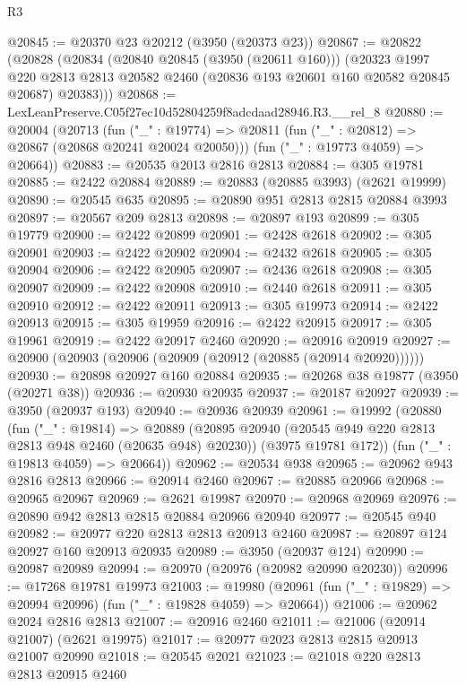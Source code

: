 \begin{lexlean}{R3}
\begin{coremodule}
@20845 := @20370 @23 @20212 (@3950 (@20373 @23))
@20867 := @20822
    (@20828
      (@20834
        (@20840 @20845 (@3950 (@20611 @160)))
        (@20323
          @1997
          @220
          @2813
          @2813
          @20582
          @2460
          (@20836 @193 @20601 @160 @20582 @20845 @20687)
          @20383)))
@20868 := LexLeanPreserve.C05f27ec10d52804259f8adcdaad28946.R3.__rel_8
@20880 := @20004
    (@20713
      (fun ("_" : @19774) => @20811 (fun ("_" : @20812) => @20867 (@20868 @20241 @20024 @20050)))
      (fun ("_" : @19773 @4059) => @20664))
@20883 := @20535 @2013 @2816 @2813
@20884 := @305 @19781
@20885 := @2422 @20884
@20889 := @20883 (@20885 @3993) (@2621 @19999)
@20890 := @20545 @635
@20895 := @20890 @951 @2813 @2815 @20884 @3993
@20897 := @20567 @209 @2813
@20898 := @20897 @193
@20899 := @305 @19779
@20900 := @2422 @20899
@20901 := @2428 @2618
@20902 := @305 @20901
@20903 := @2422 @20902
@20904 := @2432 @2618
@20905 := @305 @20904
@20906 := @2422 @20905
@20907 := @2436 @2618
@20908 := @305 @20907
@20909 := @2422 @20908
@20910 := @2440 @2618
@20911 := @305 @20910
@20912 := @2422 @20911
@20913 := @305 @19973
@20914 := @2422 @20913
@20915 := @305 @19959
@20916 := @2422 @20915
@20917 := @305 @19961
@20919 := @2422 @20917 @2460
@20920 := @20916 @20919
@20927 := @20900 (@20903 (@20906 (@20909 (@20912 (@20885 (@20914 @20920))))))
@20930 := @20898 @20927 @160 @20884
@20935 := @20268 @38 @19877 (@3950 (@20271 @38))
@20936 := @20930 @20935
@20937 := @20187 @20927
@20939 := @3950 (@20937 @193)
@20940 := @20936 @20939
@20961 := @19992
    (@20880
      (fun ("_" : @19814) =>
      @20889
        (@20895 @20940 (@20545 @949 @220 @2813 @2813 @948 @2460 (@20635 @948) @20230))
        (@3975 @19781 @172))
      (fun ("_" : @19813 @4059) => @20664))
@20962 := @20534 @938
@20965 := @20962 @943 @2816 @2813
@20966 := @20914 @2460
@20967 := @20885 @20966
@20968 := @20965 @20967
@20969 := @2621 @19987
@20970 := @20968 @20969
@20976 := @20890 @942 @2813 @2815 @20884 @20966 @20940
@20977 := @20545 @940
@20982 := @20977 @220 @2813 @2813 @20913 @2460
@20987 := @20897 @124 @20927 @160 @20913 @20935
@20989 := @3950 (@20937 @124)
@20990 := @20987 @20989
@20994 := @20970 (@20976 (@20982 @20990 @20230))
@20996 := @17268 @19781 @19973
@21003 := @19980 (@20961 (fun ("_" : @19829) => @20994 @20996) (fun ("_" : @19828 @4059) => @20664))
@21006 := @20962 @2024 @2816 @2813
@21007 := @20916 @2460
@21011 := @21006 (@20914 @21007) (@2621 @19975)
@21017 := @20977 @2023 @2813 @2815 @20913 @21007 @20990
@21018 := @20545 @2021
@21023 := @21018 @220 @2813 @2813 @20915 @2460

\end{coremodule}
\end{lexlean}
